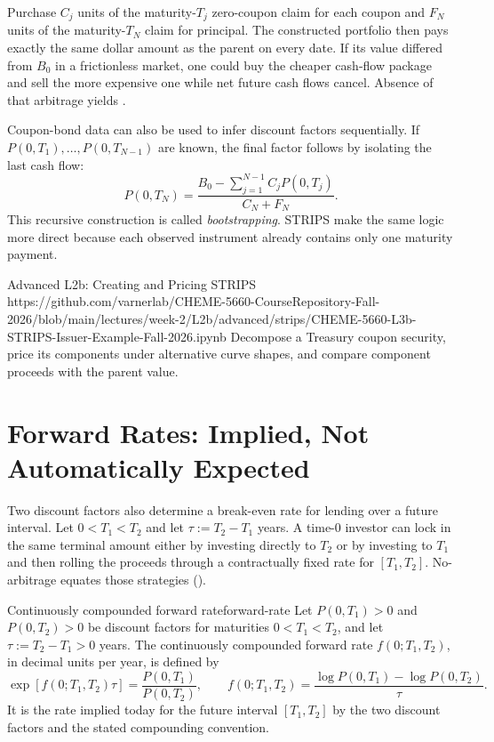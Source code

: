 \documentclass[11pt]{article}
\begin{document}
\begin{derivation}
Purchase $C_j$ units of the maturity-$T_j$ zero-coupon claim for each coupon and $F_N$ units of the maturity-$T_N$ claim for principal. The constructed portfolio then pays exactly the same dollar amount as the parent on every date. If its value differed from $B_0$ in a frictionless market, one could buy the cheaper cash-flow package and sell the more expensive one while net future cash flows cancel. Absence of that arbitrage yields .
\end{derivation}

Coupon-bond data can also be used to infer discount factors sequentially. If $P(0,T_1),\ldots,P(0,T_{N-1})$ are known, the final factor follows by isolating the last cash flow:
\begin{equation}
  \label{eq:bootstrap}
  P(0,T_N)=
  \frac{B_0-\sum_{j=1}^{N-1}C_jP(0,T_j)}{C_N+F_N}.
\end{equation}
This recursive construction is called \emph{bootstrapping}. STRIPS make the same logic more direct because each observed instrument already contains only one maturity payment.

\notebooklink
  {Advanced L2b: Creating and Pricing STRIPS}
  {https://github.com/varnerlab/CHEME-5660-CourseRepository-Fall-2026/blob/main/lectures/week-2/L2b/advanced/strips/CHEME-5660-L3b-STRIPS-Issuer-Example-Fall-2026.ipynb}
  {Decompose a Treasury coupon security, price its components under alternative curve shapes, and compare component proceeds with the parent value.}

\section{Forward Rates: Implied, Not Automatically Expected}

Two discount factors also determine a break-even rate for lending over a future interval. Let $0<T_1<T_2$ and let $\tau:=T_2-T_1$ years. A time-0 investor can lock in the same terminal amount either by investing directly to $T_2$ or by investing to $T_1$ and then rolling the proceeds through a contractually fixed rate for $[T_1,T_2]$. No-arbitrage equates those strategies ().

\begin{definition}{Continuously compounded forward rate}{forward-rate}
Let $P(0,T_1)>0$ and $P(0,T_2)>0$ be discount factors for maturities $0<T_1<T_2$, and let $\tau:=T_2-T_1>0$ years. The continuously compounded forward rate $f(0;T_1,T_2)$, in decimal units per year, is defined by
\begin{equation}
  \label{eq:forward-rate}
  \exp[f(0;T_1,T_2)\tau]
  =\frac{P(0,T_1)}{P(0,T_2)},
  \qquad
  f(0;T_1,T_2)=\frac{\log P(0,T_1)-\log P(0,T_2)}{\tau}.
\end{equation}
It is the rate implied today for the future interval $[T_1,T_2]$ by the two discount factors and the stated compounding convention.
\end{definition}
\end{document}
